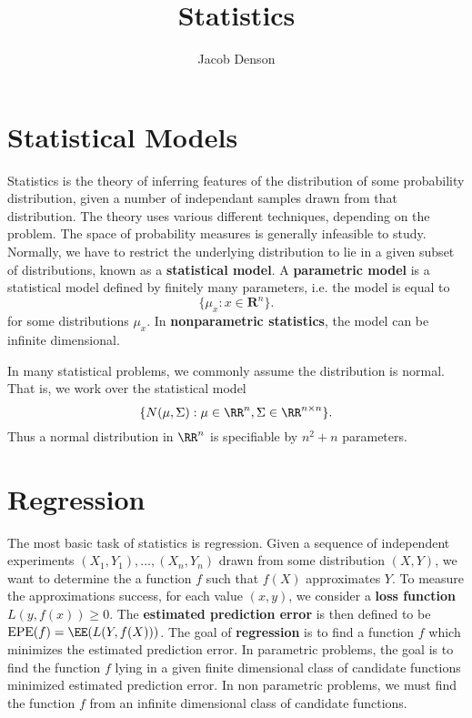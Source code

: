 

\DeclareMathOperator*{\argmin}{arg\,min}

\title{Statistics}
\author{Jacob Denson}



\maketitle
\tableofcontents
{}

\chapter{Statistical Models}

Statistics is the theory of inferring features of the distribution of some probability distribution, given a number of independant samples drawn from that distribution. The theory uses various different techniques, depending on the problem. The space of probability measures is generally infeasible to study. Normally, we have to restrict the underlying distribution to lie in a given subset of distributions, known as a {\bf statistical model}. A {\bf parametric model} is a statistical model defined by finitely many parameters, i.e. the model is equal to
%
\[ \{ \mu_x : x \in \mathbf{R}^n \}. \]
%
for some distributions $\mu_x$. In {\bf nonparametric statistics}, the model can be infinite dimensional.

\begin{example}
    In many statistical problems, we commonly assume the distribution is normal. That is, we work over the statistical model
    \[ \{ N(\mu,\Sigma): \mu \in \RR^n, \Sigma \in \RR^{n \times n} \}. \]
    Thus a normal distribution in $\RR^n$ is specifiable by $n^2 + n$ parameters.
\end{example}

\chapter{Regression}

The most basic task of statistics is regression. Given a sequence of independent experiments $(X_1, Y_1), \dots, (X_n, Y_n)$ drawn from some distribution $(X,Y)$, we want to determine the a function $f$ such that $f(X)$ approximates $Y$. To measure the approximations success, for each value $(x,y)$, we consider a {\bf loss function} $L(y,f(x)) \geq 0$. The {\bf estimated prediction error} is then defined to be $\text{EPE}(f) = \EE(L(Y,f(X)))$. The goal of {\bf regression} is to find a function $f$ which minimizes the estimated prediction error. In parametric problems, the goal is to find the function $f$ lying in a given finite dimensional class of candidate functions minimized estimated prediction error. In non parametric problems, we must find the function $f$ from an infinite dimensional class of candidate functions.

